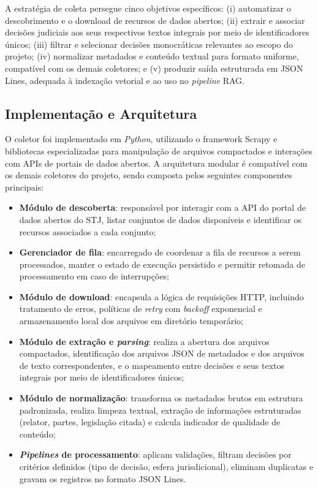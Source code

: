 A estratégia de coleta persegue cinco objetivos específicos: (i) automatizar o descobrimento e o download de recursos de dados abertos; (ii) extrair e associar decisões judiciais aos seus respectivos textos integrais por meio de identificadores únicos; (iii) filtrar e selecionar decisões monocráticas relevantes ao escopo do projeto; (iv) normalizar metadados e conteúdo textual para formato uniforme, compatível com os demais coletores; e (v) produzir saída estruturada em JSON Lines, adequada à indexação vetorial e ao uso no \textit{pipeline} RAG.

\subsection{Implementação e Arquitetura}
O coletor foi implementado em \textit{Python}, utilizando o framework Scrapy e bibliotecas especializadas para manipulação de arquivos compactados e interações com APIs de portais de dados abertos. A arquitetura modular é compatível com os demais coletores do projeto, sendo composta pelos seguintes componentes principais:

\begin{itemize}
  \item \textbf{Módulo de descoberta}: responsável por interagir com a API do portal de dados abertos do STJ, listar conjuntos de dados disponíveis e identificar os recursos associados a cada conjunto;
  \item \textbf{Gerenciador de fila}: encarregado de coordenar a fila de recursos a serem processados, manter o estado de execução persistido e permitir retomada de processamento em caso de interrupções;
  \item \textbf{Módulo de download}: encapsula a lógica de requisições HTTP, incluindo tratamento de erros, políticas de \textit{retry} com \textit{backoff} exponencial e armazenamento local dos arquivos em diretório temporário;
  \item \textbf{Módulo de extração e \textit{parsing}}: realiza a abertura dos arquivos compactados, identificação dos arquivos JSON de metadados e dos arquivos de texto correspondentes, e o mapeamento entre decisões e seus textos integrais por meio de identificadores únicos;
  \item \textbf{Módulo de normalização}: transforma os metadados brutos em estrutura padronizada, realiza limpeza textual, extração de informações estruturadas (relator, partes, legislação citada) e calcula indicador de qualidade de conteúdo;
  \item \textbf{\textit{Pipelines} de processamento}: aplicam validações, filtram decisões por critérios definidos (tipo de decisão, esfera jurisdicional), eliminam duplicatas e gravam os registros no formato JSON Lines.
\end{itemize}

